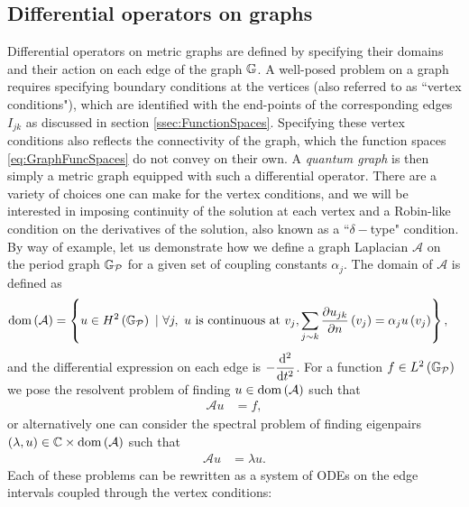 \subsection{Differential operators on graphs} \label{ssec:DiffOpsOnGraphs}
Differential operators on metric graphs are defined by specifying their domains and their action on each edge of the graph $\mathbb{G}$.
A well-posed problem on a graph requires specifying boundary conditions at the vertices (also referred to as ``vertex conditions"), which are identified with the end-points of the corresponding edges $I_{jk}$ as discussed in section \ref{ssec:FunctionSpaces}.
Specifying these vertex conditions also reflects the connectivity of the graph, which the function spaces \eqref{eq:GraphFuncSpaces} do not convey on their own.
A \emph{quantum graph} is then simply a metric graph equipped with such a differential operator.
There are a variety of choices one can make for the vertex conditions, and we will be interested in imposing continuity of the solution at each vertex and a Robin-like condition on the derivatives of the solution, also known as a ``$\delta-$type" condition. 
By way of example, let us demonstrate how we define a graph Laplacian $\mathcal{A}$ on the period graph $\mathbb{G}_{\mathcal{P}}$ for a given set of coupling constants $\alpha_j$.
The domain of $\mathcal{A}$ is defined as
\begin{align} \label{eq:GraphLaplacianExample}
	\mathrm{dom}\left( \mathcal{A} \right) &= \left\{  u\in H^2\left( \mathbb{G}_{\mathcal{P}} \right) \ \vert \ \forall j, \ u \text{ is continuous at } v_j, \sum_{j\sim k}\dfrac{\partial u_{jk}}{\partial n}\left( v_j \right) = \alpha_j u\left( v_j \right)  \right\},
\end{align}
and the differential expression on each edge is $-\dfrac{\mathrm{d}^2 }{\mathrm{d} {t}^2}$.
For a function $f\in L^2\left( \mathbb{G}_{\mathcal{P}} \right)$ we pose the resolvent problem of finding $u\in\mathrm{dom}\left( \mathcal{A} \right)$ such that
\begin{align*}
	\mathcal{A}u &= f,
\end{align*}
or alternatively one can consider the spectral problem of finding eigenpairs $\left( \lambda,u \right)\in\mathbb{C}\times\mathrm{dom}\left( \mathcal{A} \right)$ such that
\begin{align*}
	\mathcal{A}u &= \lambda u.
\end{align*}
Each of these problems can be rewritten as a system of ODEs on the edge intervals coupled through the vertex conditions:
